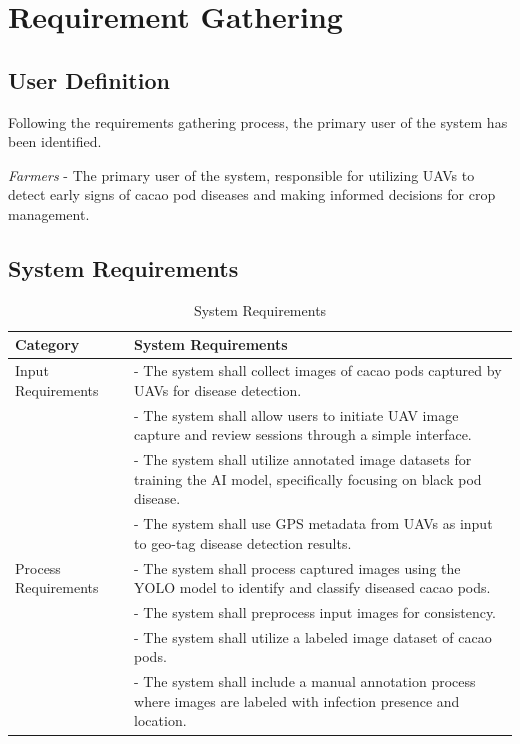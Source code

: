 	\section{Requirement Gathering}
	
	\subsection{User Definition} 
	
	Following the requirements gathering process, the primary user of the system has been identified. 
	
	\textit{Farmers} - The primary user of the system, responsible for utilizing UAVs to detect early signs of cacao pod diseases and making informed decisions for crop management.
	
	\subsection{System Requirements}
  \begin{table}[H]
    \centering
    \caption{System Requirements}
    \label{tab:sysreq1}
    \begin{tabular}{p{4cm} p{8cm}}
      \toprule
      \textbf{Category} & \textbf{System Requirements} \\
      \midrule
      Input Requirements & - The system shall collect images of cacao pods captured by UAVs for disease detection. \\
       & - The system shall allow users to initiate UAV image capture and review sessions through a simple interface. \\
        & - The system shall utilize annotated image datasets for training the AI model, specifically focusing on black pod disease. \\
         & - The system shall use GPS metadata from UAVs as input to geo-tag disease detection results. \\
         \midrule
      Process Requirements & - The system shall process captured images using the YOLO model to identify and classify diseased cacao pods. \\
       & - The system shall preprocess input images for consistency. \\
        & - The system shall utilize a labeled image dataset of cacao pods. \\
         & - The system shall include a manual annotation process where images are labeled with infection presence and location. \\
         \bottomrule
    \end{tabular}
  \end{table}

